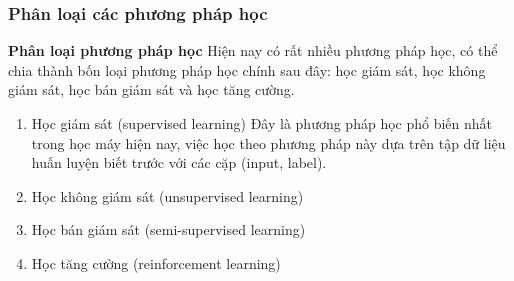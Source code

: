 
\subsubsection{Phân loại các phương pháp học}
\textbf{Phân loại phương pháp học}
Hiện nay có rất nhiều phương pháp học, có thể chia thành bốn loại phương pháp học chính sau đây: học giám sát, học không giám sát, học bán giám sát và học tăng cường.

\begin{enumerate}
    \item Học giám sát (supervised learning)
    Đây là phương pháp học phổ biến nhất trong học máy hiện nay, việc học theo phương pháp này dựa trên tập dữ liệu huấn luyện biết trước với các cặp (input, label). 

    \item Học không giám sát (unsupervised learning)
    \item Học bán giám sát (semi-supervised learning)
    \item Học tăng cường (reinforcement learning)
\end{enumerate}


